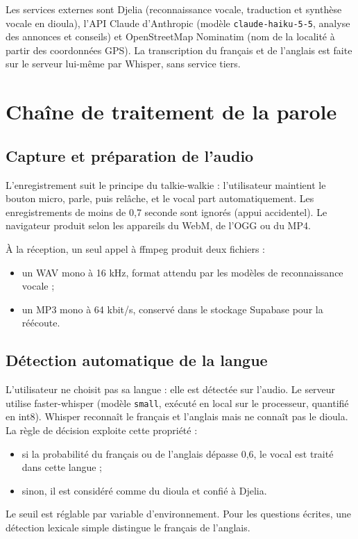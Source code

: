 \documentclass[12pt,a4paper]{article}
\begin{document}
Les services externes sont Djelia (reconnaissance vocale, traduction et synthèse vocale en dioula),
l'API Claude d'Anthropic (modèle \texttt{claude-haiku-5-5}, analyse des annonces et conseils) et
OpenStreetMap Nominatim (nom de la localité à partir des coordonnées GPS). La transcription du
français et de l'anglais est faite sur le serveur lui-même par Whisper, sans service tiers.

\section{Chaîne de traitement de la parole}

\subsection{Capture et préparation de l'audio}

L'enregistrement suit le principe du talkie-walkie : l'utilisateur maintient le bouton micro, parle,
puis relâche, et le vocal part automatiquement. Les enregistrements de moins de 0,7 seconde sont
ignorés (appui accidentel). Le navigateur produit selon les appareils du WebM, de l'OGG ou du MP4.

À la réception, un seul appel à ffmpeg produit deux fichiers :
\begin{itemize}
  \item un WAV mono à 16 kHz, format attendu par les modèles de reconnaissance vocale ;
  \item un MP3 mono à 64 kbit/s, conservé dans le stockage Supabase pour la réécoute.
\end{itemize}

\subsection{Détection automatique de la langue}

L'utilisateur ne choisit pas sa langue : elle est détectée sur l'audio. Le serveur utilise
faster-whisper (modèle \texttt{small}, exécuté en local sur le processeur, quantifié en int8).
Whisper reconnaît le français et l'anglais mais ne connaît pas le dioula. La règle de décision
exploite cette propriété :
\begin{itemize}
  \item si la probabilité du français ou de l'anglais dépasse 0,6, le vocal est traité dans cette langue ;
  \item sinon, il est considéré comme du dioula et confié à Djelia.
\end{itemize}
Le seuil est réglable par variable d'environnement. Pour les questions écrites, une détection
lexicale simple distingue le français de l'anglais.
\end{document}
